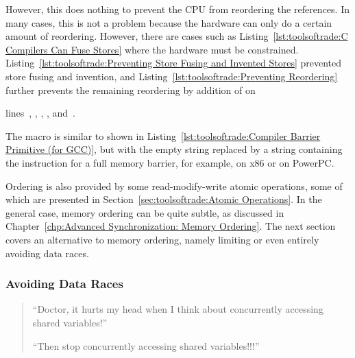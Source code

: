 However, this does nothing to prevent the CPU from reordering the
references.
In many cases, this is not a problem because the hardware can only do
a certain amount of reordering.
However, there are cases such as
Listing~\ref{lst:toolsoftrade:C Compilers Can Fuse Stores} where the
hardware must be constrained.
Listing~\ref{lst:toolsoftrade:Preventing Store Fusing and Invented Stores}
prevented store fusing and invention, and
Listing~\ref{lst:toolsoftrade:Preventing Reordering}
further prevents the remaining reordering by addition of
 on
\begin{fcvref}
lines~, , , ,
and~.
\end{fcvref}
The  macro is similar to  shown in
Listing~\ref{lst:toolsoftrade:Compiler Barrier Primitive (for GCC)},
but with the empty string replaced by a string containing the
instruction for a full memory barrier, for example, 
on x86 or  on PowerPC.

\QuickQuizEnd

Ordering is also provided by some read-modify-write atomic
operations, some of which are presented in
Section~\ref{sec:toolsoftrade:Atomic Operations}.
In the general case, memory ordering can be quite subtle, as
discussed in
Chapter~\ref{chp:Advanced Synchronization: Memory Ordering}.
The next section covers an alternative to memory ordering, namely
limiting or even entirely avoiding data races.

\subsubsection{Avoiding Data Races}
\label{sec:toolsoftrade:Avoiding Data Races}

\begin{quote}
``Doctor, it hurts my head when I think about concurrently accessing
shared variables!''

``Then stop concurrently accessing shared variables!!!''
\end{quote}

